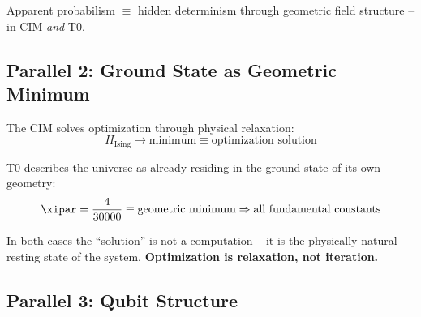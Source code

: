 \begin{keyresult}[Parallel 1]
    Apparent probabilism $\equiv$ hidden determinism through geometric field structure --
    in CIM \emph{and} T0.
\end{keyresult}

\subsection{Parallel 2: Ground State as Geometric Minimum}

The CIM solves optimization through physical relaxation:
\begin{equation}
    H_{\text{Ising}} \rightarrow \text{minimum} \equiv \text{optimization solution}
    \label{eq:cim_groundstate}
\end{equation}

T0 describes the universe as already residing in the ground state of its own geometry:
\begin{equation}
    \xipar = \frac{4}{30000} \equiv \text{geometric minimum} \Rightarrow
    \text{all fundamental constants}
    \label{eq:t0_groundstate}
\end{equation}

In both cases the ``solution'' is not a computation -- it is the physically natural
resting state of the system. \textbf{Optimization is relaxation, not iteration.}

\subsection{Parallel 3: Qubit Structure}

\begin{table}[h]
    \centering
    \caption{Parallel 3: Comparison of qubit structures}
    \label{tab:parallel3}
\end{table}

